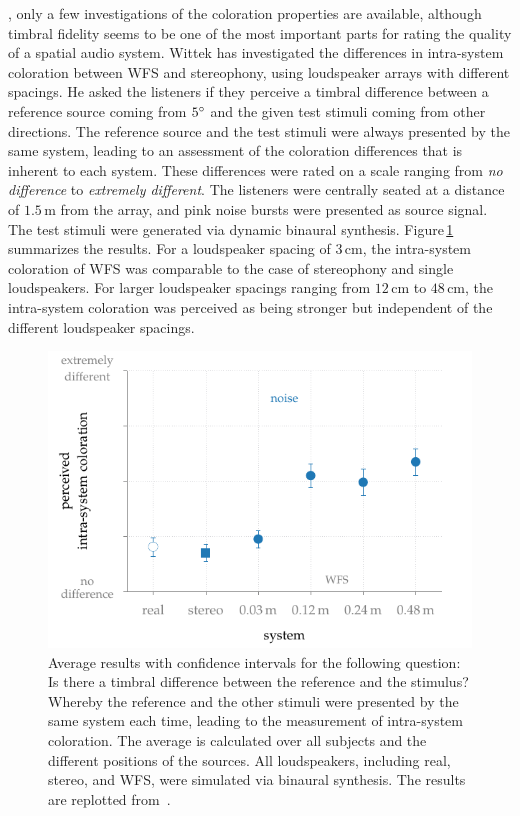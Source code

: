 , only a few investigations of the coloration properties
are available, although timbral fidelity seems to be one of the most important
parts for rating the quality of a spatial audio system.\autocite{Rumsey2005}
Wittek\autocite{Wittek2007} has investigated the differences in intra-system
coloration between \ac{WFS} and stereophony, using loudspeaker arrays with different spacings.
He asked the listeners if they perceive a timbral
difference between a reference source coming from $5^\circ$ and the given test
stimuli coming from other directions. The reference source and the test stimuli
were always presented by the same system, leading to an assessment of the
coloration differences that is inherent to each system. These
differences were rated on a scale ranging from \emph{no difference}
to \emph{extremely different}.
The listeners were centrally seated at a distance of
$1.5$\,m from the array, and pink noise bursts were presented as source signal.
The test stimuli were generated via dynamic binaural synthesis.
Figure\,\ref{fig:wfs_coloration_wittek} summarizes the results.
For a loudspeaker spacing of $3$\,cm, the intra-system coloration of \ac{WFS}
was comparable to the case of stereophony and single loudspeakers. For
larger loudspeaker spacings ranging from $12$\,cm to $48$\,cm, the intra-system
coloration was perceived as being stronger but independent of the different
loudspeaker spacings.
%
\begin{figure}[t]
    \centering
    \includegraphics{fig5_06/fig5_06}
    \caption{Average results with confidence intervals for the following question:
    Is there a timbral difference between the reference and the stimulus?
    Whereby the reference and the other stimuli were presented by the same
    system each time, leading to the measurement of intra-system coloration.
    The average is calculated over all subjects and the different positions of the
    sources. All loudspeakers, including real, stereo, and WFS, were simulated
    via binaural synthesis. The results are replotted
    from~\cite[][Fig.\,8.6]{Wittek2007}.
    }
    \label{fig:wfs_coloration_wittek}
\end{figure}

